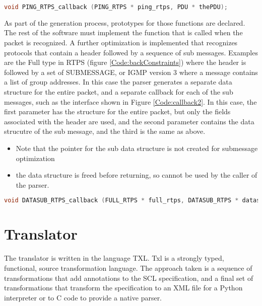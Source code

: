 \documentclass[12pt,oneside,letterpaper]{article}
\begin{document}
\begin{lstlisting}[language=C,style=CStyle,frame=none,
caption=RTPS Ping Callback,label=Code:callback1, xleftmargin=3.5ex]
void PING_RTPS_callback (PING_RTPS * ping_rtps, PDU * thePDU);
\end{lstlisting}

As part of the generation process, prototypes for those functions are declared. The rest of the software must implement the function that is called when the packet is recognized. A further optimization is implemented that recognizes protocols that contain a header followed by a sequence of sub messages. Examples are the Full type in RTPS (figure \ref{Code:backConstraints}) where the header is followed by a set of SUBMESSAGE, or IGMP version 3 where a message contains a list of group addresses. In this case the parser generates a separate data structure for the entire packet, and a separate callback for each of the sub messages, such as the interface shown in Figure \ref{Code:callback2}. In this case, the first parameter has the structure for the entire packet, but only the fields associated with the header are used, and the second parameter contains the data strucutre of the sub message, and the third is the same as above.

\begin{itemize}
    \item Note that the pointer for the sub data structure is not created for submessage optimization
    \item the data structure is freed before returning, so cannot be used by the caller of the parser.
\end{itemize}

\begin{lstlisting}[language=C,style=CStyle,frame=none,
caption=Submessage Callback,label=Code:callback2, xleftmargin=3.5ex]
void DATASUB_RTPS_callback (FULL_RTPS * full_rtps, DATASUB_RTPS * datasub_rtps, PDU * thePDU);
\end{lstlisting}


\section {Translator}
\label{sec:translator}
The translator is written in the language TXL\cite{txl}. Txl is a strongly typed, functional, source transformation language.  The approach taken is a sequence of transformations that add annotations to the SCL specification, and a final set of transformations that transform the specification to an XML file for a Python interpreter or to C code to provide a native parser.
\end{document}
